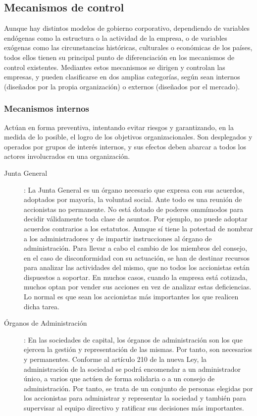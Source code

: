 \documentclass[12pt,a4paper,spanish]{report}
\begin{document}
		\subsection{\textcolor[rgb]{0.9,0.3,0.3}Mecanismos de control}
			Aunque hay distintos modelos de gobierno corporativo, dependiendo de variables endógenas como la estructura o la actividad de la empresa, o de variables exógenas como las circunstancias históricas, culturales o económicas de los países, todos ellos tienen su principal punto de diferenciación en los mecanismos de control existentes. Mediantes estos mecanismos se dirigen y controlan las empresas, y pueden clasificarse en dos amplias categorías, según sean internos (diseñados por la propia organización) o externos (diseñados por el mercado).

			\subsubsection*{\textcolor[rgb]{0.9,0.3,0.3}Mecanismos internos}
				Actúan en forma preventiva, intentando evitar riesgos y garantizando, en la medida de lo posible, el logro de los objetivos organizacionales. Son desplegados y operados por grupos de interés internos, y sus efectos deben abarcar a todos los actores involucrados en una organización.

				\begin{description}
					\item[Junta General]: La Junta General es un órgano necesario que expresa con sus acuerdos, adoptados por mayoría, la voluntad social. Ante todo es una reunión de accionistas no permanente. No está dotado de poderes ommímodos para decidir válidamente toda clase de asuntos. Por ejemplo, no puede adoptar acuerdos contrarios a los estatutos. Aunque sí tiene la potestad de nombrar a los administradores y de impartir instrucciones al órgano de administración. Para llevar a cabo el cambio de los miembros del consejo, en el caso de disconformidad con su actuación, se han de destinar recursos para analizar las actividades del mismo, que no todos los accionistas están dispuestos a soportar. En muchos casos, cuando la empresa está cotizada, muchos optan por vender sus acciones en vez de analizar estas deficiencias. Lo normal es que sean los accionistas más importantes los que realicen dicha tarea.

					\item[Órganos de Administración]: En las sociedades de capital, los órganos de administración son los que ejercen la gestión y representación de las mismas. Por tanto, son necesarios y permanentes. Conforme al artículo 210 de la nueva Ley, la administración de la sociedad se podrá encomendar a un administrador único, a varios que actúen de forma solidaria o a un consejo de administración. Por tanto, se trata de un conjunto de personas elegidas por los accionistas para administrar y representar la sociedad y también para supervisar al equipo directivo y ratificar sus decisiones más importantes.
				\end{description}
\end{document}

